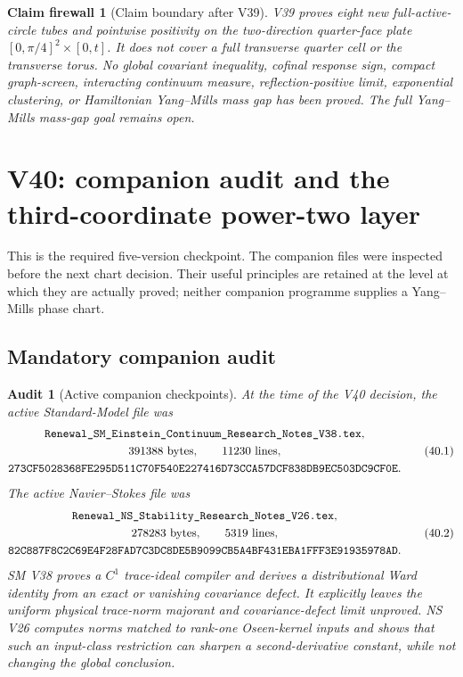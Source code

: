 \documentclass[11pt,oneside]{article}
\newtheorem{firewall}[theorem]{Claim firewall}
\newtheorem{audit}[theorem]{Audit}
\theoremstyle{definition}
\theoremstyle{remark}
\begin{document}
\begin{firewall}[Claim boundary after V39]
\label{fire:newv39-final}
V39 proves eight new full-active-circle tubes and pointwise
positivity on the two-direction quarter-face plate
\([0,\pi/4]^2\times[0,t]\).  It does not cover a full transverse
quarter cell or the transverse torus.  No global covariant
inequality, cofinal response sign, compact graph-screen,
interacting continuum measure, reflection-positive limit,
exponential clustering, or Hamiltonian Yang--Mills mass gap has
been proved.  The full Yang--Mills mass-gap goal remains open.
\end{firewall}

\section{V40: companion audit and the third-coordinate power-two layer}
\label{sec:newv40-third-layer}

This is the required five-version checkpoint.  The companion files
were inspected before the next chart decision.  Their useful
principles are retained at the level at which they are actually
proved; neither companion programme supplies a Yang--Mills phase
chart.

\subsection{Mandatory companion audit}

\begin{audit}[Active companion checkpoints]
\label{aud:newv40-companions}
At the time of the V40 decision, the active Standard-Model file was
\[
\begin{gathered}
\texttt{Renewal\_SM\_Einstein\_Continuum\_Research\_Notes\_V38.tex},\\
391388\ {\rm bytes},\qquad11230\ {\rm lines},\\
\texttt{273CF5028368FE295D511C70F540E227416D73CCA57DCF838DB9EC503DC9CF0E}.
\end{gathered}                                           \tag{40.1}
\]
The active Navier--Stokes file was
\[
\begin{gathered}
\texttt{Renewal\_NS\_Stability\_Research\_Notes\_V26.tex},\\
278283\ {\rm bytes},\qquad5319\ {\rm lines},\\
\texttt{82C887F8C2C69E4F28FAD7C3DC8DE5B9099CB5A4BF431EBA1FFF3E91935978AD}.
\end{gathered}                                           \tag{40.2}
\]
SM V38 proves a \(C^1\) trace-ideal compiler and derives a
distributional Ward identity from an exact or vanishing covariance
defect.  It explicitly leaves the uniform physical trace-norm
majorant and covariance-defect limit unproved.  NS V26 computes
norms matched to rank-one Oseen-kernel inputs and shows that such an
input-class restriction can sharpen a second-derivative constant,
while not changing the global conclusion.
\end{audit}
\end{document}
